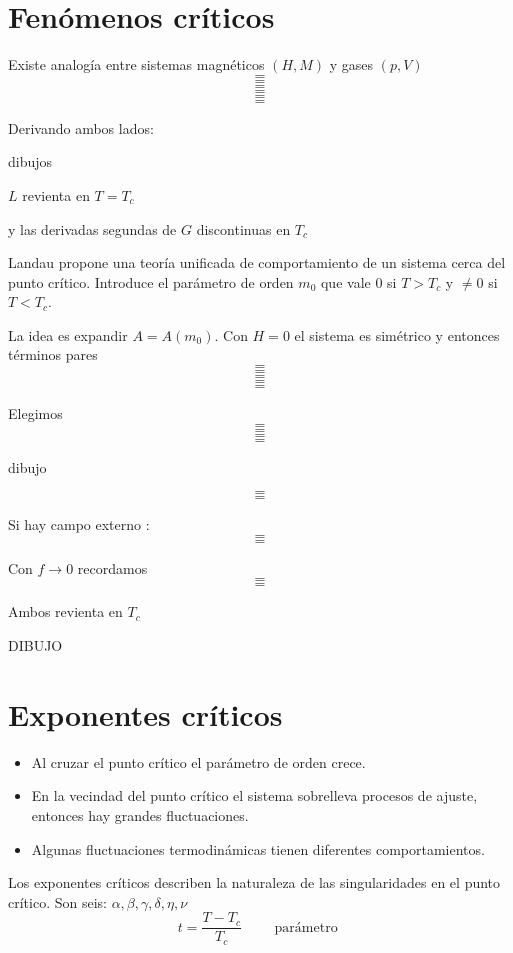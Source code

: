 \documentclass[10pt,oneside]{CBFT_book}
\begin{document}
\section{Fenómenos críticos}

Existe analogía entre sistemas magnéticos $(H,M)$ y gases $(p,V)$
\[=\]
\[=\]
\[=\]
\[=\]
\[=\]
\[=\]

Derivando ambos lados:

dibujos

$L$ revienta en $T=T_c$

y las derivadas segundas de $G$ discontinuas en $T_c$

Landau propone una teoría unificada de comportamiento de un sistema cerca del punto crítico.
Introduce el parámetro de orden $m_0$ que vale 0 si $T>T_c$ y $\neq 0$ si $T<T_c$.

La idea es expandir $ A = A(m_0) $.
Con $H=0$ el sistema es simétrico y entonces términos pares
\[=\]
\[=\]
\[=\]
\[=\]
\[=\]

Elegimos
\[=\]
\[=\]
\[=\]
\[=\]

dibujo

\[=\]
\[=\]

Si hay campo externo :
\[=\]
\[=\]

Con $f \to 0$ recordamos
\[=\]
\[=\]

Ambos revienta en $T_c$

DIBUJO

\section{Exponentes críticos}

\begin{itemize}
 \item Al cruzar el punto crítico el parámetro de orden crece.
 \item En la vecindad del punto crítico el sistema sobrelleva procesos de ajuste, entonces
 hay grandes fluctuaciones.
 \item Algunas fluctuaciones termodinámicas tienen diferentes comportamientos.
\end{itemize}

Los exponentes críticos describen la naturaleza de las singularidades en el punto crítico.
Son seis: $ \alpha, \beta, \gamma, \delta, \eta, \nu $
\[
	t = \frac{T-T_c}{T_c} \qquad \text{ parámetro } 
\]
\end{document}
